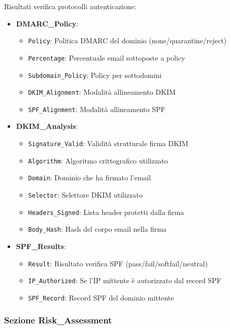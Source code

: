 \documentclass{article}
\begin{document}
Risultati verifica protocolli autenticazione:

\begin{itemize}
    \item \textbf{DMARC\_Policy}:
    \begin{itemize}
        \item \texttt{Policy}: Politica DMARC del dominio (none/quarantine/reject)
        \item \texttt{Percentage}: Percentuale email sottoposte a policy
        \item \texttt{Subdomain\_Policy}: Policy per sottodomini
        \item \texttt{DKIM\_Alignment}: Modalità allineamento DKIM
        \item \texttt{SPF\_Alignment}: Modalità allineamento SPF
    \end{itemize}
    \item \textbf{DKIM\_Analysis}:
    \begin{itemize}
        \item \texttt{Signature\_Valid}: Validità strutturale firma DKIM
        \item \texttt{Algorithm}: Algoritmo crittografico utilizzato
        \item \texttt{Domain}: Dominio che ha firmato l'email
        \item \texttt{Selector}: Selettore DKIM utilizzato
        \item \texttt{Headers\_Signed}: Lista header protetti dalla firma
        \item \texttt{Body\_Hash}: Hash del corpo email nella firma
    \end{itemize}
    \item \textbf{SPF\_Results}:
    \begin{itemize}
        \item \texttt{Result}: Risultato verifica SPF (pass/fail/softfail/neutral)
        \item \texttt{IP\_Authorized}: Se l'IP mittente è autorizzato dal record SPF
        \item \texttt{SPF\_Record}: Record SPF del dominio mittente
    \end{itemize}
\end{itemize}

\subsubsection{Sezione Risk\_Assessment}
\end{document}
